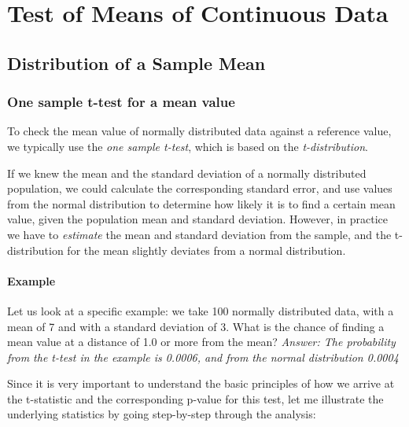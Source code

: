 \chapter{Test of Means of Continuous Data}

\section{Distribution of a Sample Mean}

\subsection{One sample t-test for a mean value} 

To check the mean value of normally distributed data against a reference value, we typically use the \emph{one sample t-test}, which is based on the \emph{t-distribution}.

If we knew the mean and the standard deviation of a normally distributed population, we could calculate the corresponding standard error, and use values from the normal distribution to determine how likely it is to find a certain mean value, given the population mean and standard deviation. However, in practice we have to \emph{estimate} the mean and standard deviation from the sample, and the t-distribution for the mean slightly deviates from a normal distribution.

\subsubsection{Example}

Let us look at a specific example: we take 100 normally distributed data, with a mean of 7 and with a standard deviation of 3.
What is the chance of finding a mean value at a distance of 1.0 or more from the mean? \emph{Answer: The probability from the t-test in the example is 0.0006, and from the normal distribution 0.0004}

Since it is very important to understand the basic principles of how we arrive at the t-statistic and the corresponding p-value for this test, let me illustrate the underlying statistics by going step-by-step through the analysis:

